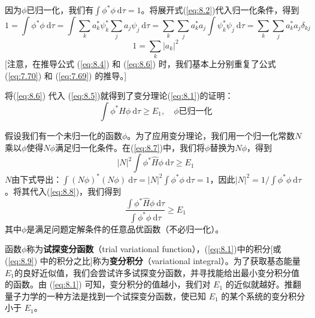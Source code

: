     因为$\phi$已归一化，我们有$\int \phi^{\ast} \phi \: \mathrm{d}\tau = 1$。将展开式(\ref{eq:8.2})代入归一化条件，得到
    \begin{equation*}
        1 = \int \phi^{\ast} \phi \: \mathrm{d}\tau = \int \sum_{k} a_k^{\ast} \psi_k^{\ast} \sum_{j} a_j \psi_j \: \mathrm{d}\tau = \sum_{k} \sum_{j} a_k^{\ast} a_j \int \psi_k^{\ast} \psi_j \: \mathrm{d}\tau = \sum_{k} \sum_{j} a_k^{\ast} a_j \delta_{kj}
    \end{equation*}
    \begin{equation}
        1 = \sum_{k} |a_k|^2
        \label{eq:8.6}
    \end{equation}
    [注意，在推导公式 (\ref{eq:8.4}) 和 (\ref{eq:8.6}) 时，我们基本上分别重复了公式 (\ref{eq:7.70}) 和 (\ref{eq:7.69}) 的推导。]

    将(\ref{eq:8.6}) 代入 (\ref{eq:8.5})就得到了变分理论(\ref{eq:8.1})的证明：
    \begin{equation}
        \int \phi^{\ast} \hat{H}\phi \:\mathrm{d}\tau \geq E_1, \quad \phi \text{已归一化}
        \label{eq:8.7}
    \end{equation}

    假设我们有一个未归一化的函数$\phi$。为了应用变分理论，我们用一个归一化常数$N$乘以$\phi$使得$N\phi$满足归一化条件。在(\ref{eq:8.7})中，我们将$\phi$替换为$N\phi$，得到
    \begin{equation}
        \left|N\right|^2 \int \phi^{\ast} \hat{H}\phi \:\mathrm{d}\tau \geq E_1
        \label{eq:8.8}
    \end{equation}
    $N$由下式导出：$\int \left(N\phi\right)^{\ast} \left(N\phi\right) \:\mathrm{d}\tau = \left|N\right|^2 \int \phi^{\ast} \phi \:\mathrm{d}\tau = 1$，因此$\left|N\right|^2 = 1/\int \phi^{\ast} \phi \:\mathrm{d}\tau$。将其代入(\ref{eq:8.8})，我们得到
    \begin{equation}
        \boxed{
            \frac{\int \phi^{\ast} \hat{H}\phi \:\mathrm{d}\tau}{\int \phi^{\ast} \phi \:\mathrm{d}\tau} \geq E_1
        }
        \label{eq:8.9}
    \end{equation}
    其中$\phi$是满足问题定解条件的任意品优函数（不必归一化）。

    函数$\phi$称为\textbf{试探变分函数}（trial variational function），(\ref{eq:8.1})中的积分[或 (\ref{eq:8.9}) 中的积分之比]称为\textbf{变分积分}（variational integral）。为了获取基态能量$E_1$的良好近似值，我们会尝试许多试探变分函数，并寻找能给出最小变分积分值的函数。由 (\ref{eq:8.1}) 可知，变分积分的值越小，我们对 $E_1$ 的近似就越好。推翻量子力学的一种方法是找到一个试探变分函数，使已知 $E_1$ 的某个系统的变分积分小于 $E_1$。

